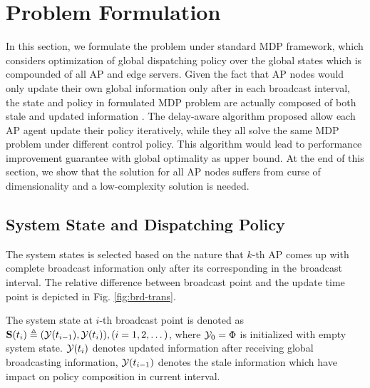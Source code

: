 \section{Problem Formulation}
In this section, we formulate the problem under standard MDP framework, which considers optimization of global dispatching policy over the global states which is compounded of all AP and edge servers.
Given the fact that AP nodes would only update their own global information only after \brdelay in each broadcast interval, the state and policy in formulated MDP problem are actually composed of both stale and updated information .
The delay-aware algorithm proposed allow each AP agent update their policy iteratively, while they all solve the same MDP problem under different control policy. This algorithm would lead to performance improvement guarantee with global optimality as upper bound.
At the end of this section, we show that the solution for all AP nodes suffers from curse of dimensionality and a low-complexity solution is needed.

\subsection{System State and Dispatching Policy}

The system states is selected based on the nature that $k$-th AP comes up with complete broadcast information only after its corresponding \brdelay in the broadcast interval.
The relative difference between broadcast point and the update time point is depicted in Fig. \ref{fig:brd-trans}.
\begin{definition}
    The system state at $i$-th broadcast point is denoted as
    $\mathbf{S}(t_i) \triangleq (\mathcal{Y}(t_{i-1}), \mathcal{Y}(t_{i})), (i=1,2,\dots)$,
    where $\mathcal{Y}_{0} =\Phi$ is initialized with empty system state.
    $\mathcal{Y}(t_{i})$ denotes updated information after receiving global broadcasting information, $\mathcal{Y}(t_{i-1})$ denotes the stale information which have impact on policy composition in current interval.
\end{definition}

